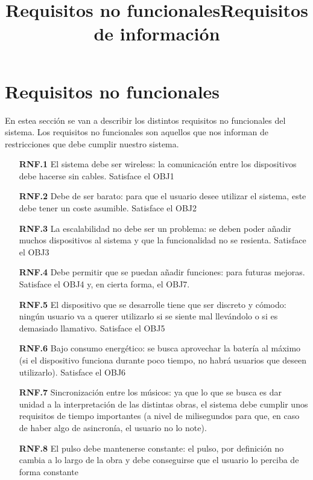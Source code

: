 \title{Requisitos no funcionales}
\section{Requisitos no funcionales}

En estea sección se van a describir los distintos requisitos no funcionales del sistema.
Los requisitos no funcionales son aquellos que nos informan de restricciones que debe cumplir
nuestro sistema.\\


\begin{itemize}
    \item[\textbf{RNF.1}] El sistema debe ser wireless: la comunicación entre los
      dispositivos debe hacerse sin cables. Satisface el OBJ1
    \item[\textbf{RNF.2}] Debe de ser barato: para que el usuario desee utilizar
      el sistema, este debe tener un coste asumible. Satisface el OBJ2
    \item[\textbf{RNF.3}] La escalabilidad no debe ser un problema: se deben poder añadir
      muchos dispositivos al sistema y que la funcionalidad no se resienta. Satisface el
      OBJ3
    \item[\textbf{RNF.4}] Debe permitir que se puedan añadir funciones: para futuras mejoras.
      Satisface el OBJ4 y, en cierta forma, el OBJ7.
    \item[\textbf{RNF.5}] El dispositivo que se desarrolle tiene que ser discreto y cómodo:
      ningún usuario va a querer utilizarlo si se siente mal llevándolo o si es demasiado llamativo.
      Satisface el OBJ5
    \item[\textbf{RNF.6}] Bajo consumo energético: se busca aprovechar la batería al máximo
      (si el dispositivo funciona durante poco tiempo, no habrá usuarios que deseen utilizarlo).
      Satisface el OBJ6
    \item[\textbf{RNF.7}] Sincronización entre los músicos: ya que lo que se busca es dar unidad
      a la interpretación de las distintas obras, el sistema debe cumplir unos requisitos de tiempo
      importantes (a nivel de milisegundos para que, en caso de haber algo de asincronía, el usuario no lo note).
    \item[\textbf{RNF.8}] El pulso debe mantenerse constante: el pulso, por definición
      no cambia a lo largo de la obra y debe conseguirse que el usuario lo perciba de forma
      constante
\end{itemize}


\title{Requisitos de información}

